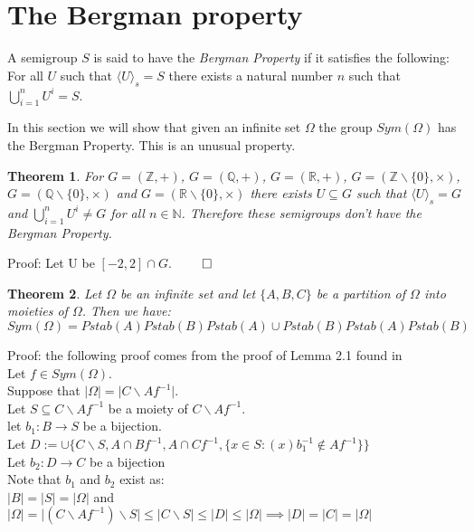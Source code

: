 \documentclass{report}
\newtheorem{theorem}{Theorem}[section]
\newenvironment{defn}[1][]{\refstepcounter{theorem}\begin{trivlist}
\item[\hskip \labelsep {\bfseries Definition  \thetheorem  \, \def\temp{#1}\ifx\temp\empty  #1\else  (#1)\fi
}]}   {\end{trivlist}}
\begin{document}
\section{The Bergman property}
\begin{defn}
A semigroup $S$ is said to have the \textit{Bergman Property} if it satisfies the following:\\
For all $U$ such that $\langle U \rangle_s = S$ there exists a natural number $n$ such that $\bigcup_{i=1}^{n} U^i =S$.
\end{defn}
In this section we will show that given an infinite set $\Omega$ the group $Sym(\Omega)$ has the Bergman Property. This is an unusual property.
\begin{theorem}
For $G = (\mathbb{Z},+)$, $G = (\mathbb{Q},+)$, $G = (\mathbb{R},+)$, $G = (\mathbb{Z} \backslash \{0\},\times)$, $G = (\mathbb{Q}\backslash \{0\},\times)$ and $G = (\mathbb{R}\backslash \{0\},\times)$ there exists $U \subseteq G$ such that $\langle U \rangle_s = G$ and $\bigcup_{i=1}^{n} U^i \neq G$ for all $n \in \mathbb{N}$. Therefore these semigroups don't have the Bergman Property.
\end{theorem}\par
Proof: Let U be $[-2,2]\cap G$. $\qed$
\begin{theorem}\label{stabgens}
Let $\Omega$ be an infinite set and let $\{A,B,C\}$ be a partition of $\Omega$ into moieties of $\Omega$. Then we have: 
$$Sym(\Omega)=Pstab(A)Pstab(B)Pstab(A)\cup Pstab(B)Pstab(A)Pstab(B)$$
\end{theorem}\par
Proof: the following proof comes from the proof of Lemma 2.1 found in \cite{finitegen}\\
 Let $f \in Sym(\Omega)$.\\
Suppose that $\vert \Omega \vert=\vert C \backslash  Af^{-1} \vert$.\\
Let $S\subseteq C \backslash Af^{-1}$ be a moiety of $C \backslash Af^{-1}$.\\
let $b_1:B \rightarrow S$ be a bijection.\\
Let $D:=\cup \{C \backslash  S, A\cap B f^{-1},A\cap C f^{-1},\{x \in S:(x)b_1^{-1} \notin Af^{-1}\}\}$\\
Let $b_2: D \rightarrow C$ be a bijection\\
Note that $b_1$ and $b_2$ exist as:\\
$\vert B \vert =  \vert S \vert = \vert \Omega \vert$ and $\vert \Omega \vert= \vert (C \backslash  Af^{-1})\backslash  S \vert \leq \vert C\backslash  S \vert \leq \vert D \vert \leq \vert \Omega \vert \implies \vert D \vert = \vert C \vert = \vert \Omega \vert$\\
\end{document}
